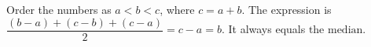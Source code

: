 Order the numbers as $a<b<c$, where $c=a+b$. The expression is $\dfrac{(b-a)+(c-b)+(c-a)}{2}=c-a=b$. It always equals $\boxed{\text{the median}}$.
